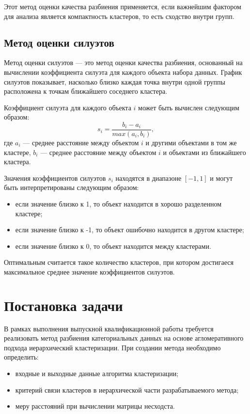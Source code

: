 Этот метод  оценки качества разбиения применяется, если важнейшим фактором для анализа является компактность кластеров, то есть сходство внутри групп.

\subsection{Метод оценки силуэтов}


Метод оценки силуэтов \cite{SilhouetteMethod} --- это метод оценки качества разбиения, основанный на вычислении коэффициента силуэта для каждого объекта набора данных. График силуэтов показывает, насколько близко каждая точка внутри одной группы расположена к точкам ближайшего соседнего кластера.

Коэффициент силуэта для каждого объекта $i$ может быть вычислен следующим образом:
\begin{equation}
    s_i = \frac{b_i - a_i}{max(a_i,b_i)}, 
\end{equation}
где $a_i$ --- среднее расстояние между объектом $i$ и другими объектами в том же кластере, $b_i$ --- среднее расстояние между объектом $i$ и объектами из ближайшего кластера.

Значения коэффициентов силуэтов $s_i$ находятся в диапазоне $[-1, 1]$ и могут быть интерпретированы следующим образом:
\begin{itemize}
    \item если значение близко к 1, то объект находится в хорошо разделенном кластере;
    \item если значение близко к -1, то объект ошибочно находится в другом кластере;
    \item если значение близко к 0, то объект находится между кластерами.
\end{itemize}

Оптимальным считается такое количество кластеров, при котором достигаеся максимальное среднее значение коэффициентов силуэтов.


\section{Постановка задачи}

В рамках выполнения выпускной квалификационной работы требуется реализовать метод разбиения категориальных данных на основе агломеративного подхода иерархический кластеризации. При создании метода необходимо определить:
\begin{itemize}
    \item входные и выходные данные алгоритма кластеризации;
    \item критерий связи кластеров в иерархической части разрабатываемого метода;
    \item меру расстояний при вычислении матрицы несходста.
\end{itemize}

